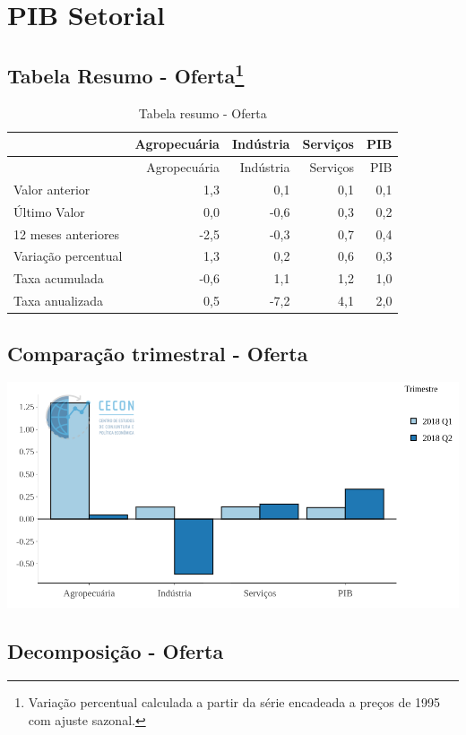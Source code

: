 \documentclass[11pt,portuguese,]{article}
\let\rmarkdownfootnote\footnote%
\def\footnote{\protect\rmarkdownfootnote}
\begin{document}
\section{PIB Setorial}\label{pib-setorial}

\subsection[Tabela Resumo - Oferta]{\texorpdfstring{Tabela Resumo -
Oferta\footnote{Variação percentual calculada a partir da série
  encadeada a preços de 1995 com ajuste sazonal.}}{Tabela Resumo - Oferta}}\label{tabela-resumo---oferta2}

\begin{longtable}[]{@{}lrrrr@{}}
\caption{Tabela resumo - Oferta}\tabularnewline
\toprule
& Agropecuária & Indústria & Serviços & PIB\tabularnewline
\midrule
\endfirsthead
\toprule
& Agropecuária & Indústria & Serviços & PIB\tabularnewline
\midrule
\endhead
Valor anterior & 1,3 & 0,1 & 0,1 & 0,1\tabularnewline
Último Valor & 0,0 & -0,6 & 0,3 & 0,2\tabularnewline
12 meses anteriores & -2,5 & -0,3 & 0,7 & 0,4\tabularnewline
Variação percentual & 1,3 & 0,2 & 0,6 & 0,3\tabularnewline
Taxa acumulada & -0,6 & 1,1 & 1,2 & 1,0\tabularnewline
Taxa anualizada & 0,5 & -7,2 & 4,1 & 2,0\tabularnewline
\bottomrule
\end{longtable}

\subsection{Comparação trimestral -
Oferta}\label{comparacao-trimestral---oferta}

\begin{center}\includegraphics[width=1\linewidth]{Grafico_Setores} \end{center}

\subsection{Decomposição - Oferta}\label{decomposicao---oferta}
\end{document}
